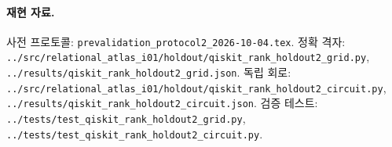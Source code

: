 \documentclass[11pt,a4paper]{article}
\begin{document}
\paragraph{재현 자료.}
사전 프로토콜: \texttt{prevalidation\_protocol2\_2026-10-04.tex}.
정확 격자: \texttt{../src/relational\_atlas\_i01/holdout/qiskit\_rank\_holdout2\_grid.py},
\texttt{../results/qiskit\_rank\_holdout2\_grid.json}.
독립 회로: \texttt{../src/relational\_atlas\_i01/holdout/qiskit\_rank\_holdout2\_circuit.py},
\texttt{../results/qiskit\_rank\_holdout2\_circuit.json}.
검증 테스트: \texttt{../tests/test\_qiskit\_rank\_holdout2\_grid.py},
\texttt{../tests/test\_qiskit\_rank\_holdout2\_circuit.py}.
\end{document}
